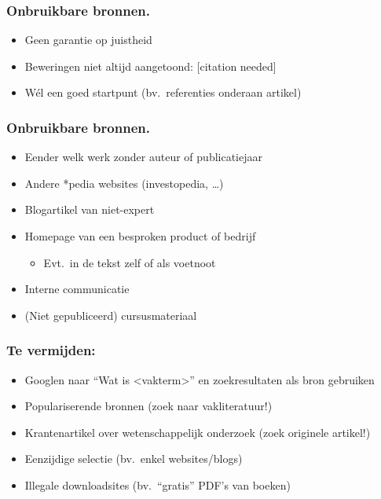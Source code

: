 \documentclass[aspectratio=169]{beamer}
\begin{document}
\begin{frame}
  \frametitle{Onbruikbare bronnen.}


  {\pause}

  \begin{itemize}
    \item Geen garantie op juistheid
    \item Beweringen niet altijd aangetoond: [citation needed]
    \item \alert{Wél} een goed startpunt (bv.\ referenties onderaan artikel)
  \end{itemize}
\end{frame}


\begin{frame}
  \frametitle{Onbruikbare bronnen.}

  \begin{itemize}
    \item Eender welk werk zonder auteur of publicatiejaar
    \item Andere *pedia websites (investopedia, \dots)
    \item Blogartikel van niet-expert
    \item Homepage van een besproken product of bedrijf
          \begin{itemize}
            \item Evt.~in de tekst zelf of als voetnoot
          \end{itemize}
    \item Interne communicatie
    \item (Niet gepubliceerd) cursusmateriaal
  \end{itemize}

\end{frame}

\begin{frame}
  \frametitle{Te vermijden:}

  \begin{itemize}
    \item Googlen naar ``Wat is <vakterm>'' en zoekresultaten als bron gebruiken
    \item Populariserende bronnen (zoek naar vakliteratuur!)
    \item Krantenartikel over wetenschappelijk onderzoek (zoek originele artikel!)
    \item Eenzijdige selectie (bv.~enkel websites/blogs)
    \item Illegale downloadsites (bv.~``gratis'' PDF's van boeken)
  \end{itemize}
\end{frame}
\end{document}
